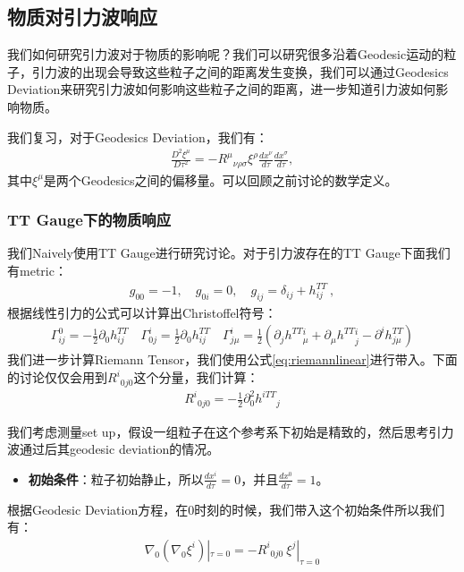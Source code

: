\subsection{物质对引力波响应}

\bigskip
{}

我们如何研究引力波对于物质的影响呢？我们可以研究很多沿着Geodesic运动的粒子，引力波的出现会导致这些粒子之间的距离发生变换，我们可以通过Geodesics
Deviation来研究引力波如何影响这些粒子之间的距离，进一步知道引力波如何影响物质。

我们复习，对于Geodesics Deviation，我们有：
\begin{align}
  \frac{D^2\xi^\mu}{D\tau^2}=-R^\mu{}_{\nu\rho\sigma}\xi^\rho\left.\frac{dx^\nu}{d\tau}\frac{dx^\sigma}{d\tau}\right.,
\end{align}
其中$ \xi^\mu $是两个Geodesics之间的偏移量。可以回顾之前讨论的数学定义。

\subsubsection{TT Gauge下的物质响应}

\bigskip
{}

我们Naively使用TT Gauge进行研究讨论。对于引力波存在的TT Gauge下面我们有metric：
\begin{align}
  g_{00}= -1, \quad g_{0i}=0, \quad g_{ij}=\delta_{ij}+h_{ij}^{TT}\mathrm{~,}
\end{align}
根据线性引力的公式可以计算出Christoffel符号：
\begin{align}
  \Gamma_{ij}^{0}=-\frac{1}{2}\partial_{0}h_{ij}^{TT} \quad
  \Gamma_{0j}^{i}=\frac{1}{2}\partial_{0}h_{ij}^{TT}\quad
  \Gamma_{j\mu}^{i}=\frac{1}{2}(\partial_{j}h^{TT}{}_\mu^i+\partial_{\mu}h^{TT}{}^{i}_j-\partial^{i}h_{j\mu}^{TT})
\end{align}
我们进一步计算Riemann Tensor，我们使用公式\cref{eq:riemannlinear}进行带入。下面的讨论仅仅会用到$
R^{i}{}_{0j0} $这个分量，我们计算：
\begin{align}
  R^{i}{}_{0j0}=-\frac{1}{2}\partial_{0}^{2}h^{iTT}{}_{j}
\end{align}

\bigskip
{}

我们考虑测量set up，假设一组粒子在这个参考系下初始是精致的，然后思考引力波通过后其geodesic deviation的情况。
\begin{itemize}
  \item \textbf{初始条件}：粒子初始静止，所以$ \frac{dx^i}{d\tau} = 0 $，并且$
    \frac{dx^0}{d\tau} = 1 $。
\end{itemize}
根据Geodesic Deviation方程，在0时刻的时候，我们带入这个初始条件所以我们有：
\begin{align}
  \nabla_{0}(\nabla_{0}\xi^{i})|_{\tau=0}=-R^{i}{}_{0j0} \ \xi^{j}|_{\tau=0}
\end{align}


